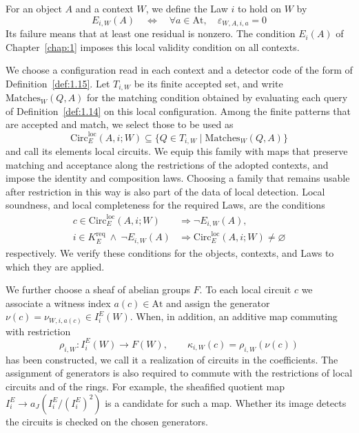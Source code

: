 \begin{definition}\label{def:2.14}

For an object $A$ and a context $W$, we define the Law $i$ to hold on $W$ by
\[
E_{i,W}(A)\quad\Longleftrightarrow\quad
\forall a\in\mathrm{At},\quad\varepsilon_{W,A,i,a}=0
\]
Its failure means that at least one residual is nonzero. The condition $E_i(A)$ of
Chapter~\ref{chap:1} imposes this local validity condition on all contexts.

We choose a configuration read in each context and a detector code of the form of
Definition~\ref{def:1.15}. Let $T_{i,W}$ be its finite accepted set, and write
$\mathrm{Matches}_W(Q,A)$ for the matching condition obtained by evaluating each query of
Definition~\ref{def:1.14} on this local configuration. Among the finite patterns that are
accepted and match, we select those to be used as
\[
\mathrm{Circ}^{\mathrm{loc}}_E(A,i;W)
\subseteq\{Q\in T_{i,W}\mid\mathrm{Matches}_W(Q,A)\}
\]
and call its elements local circuits. We equip this family with maps that preserve
matching and acceptance along the restrictions of the adopted contexts, and impose the
identity and composition laws. Choosing a family that remains usable after restriction in
this way is also part of the data of local detection. Local soundness, and local
completeness for the required Laws, are the conditions
\[
\begin{aligned}
c\in\mathrm{Circ}^{\mathrm{loc}}_E(A,i;W)
&\Longrightarrow\neg E_{i,W}(A),\\
i\in K_E^{\mathrm{req}}\ \land\ \neg E_{i,W}(A)
&\Longrightarrow\mathrm{Circ}^{\mathrm{loc}}_E(A,i;W)\ne\varnothing
\end{aligned}
\]
respectively. We verify these conditions for the objects, contexts, and Laws to which they
are applied.

We further choose a sheaf of abelian groups $F$. To each local circuit $c$ we associate a
witness index $a(c)\in\mathrm{At}$ and assign the generator
$\nu(c)=\nu_{W,i,a(c)}\in I_i^E(W)$. When, in addition, an additive map commuting with
restriction
\begin{equation*}
\rho_{i,W}:I_i^E(W)\longrightarrow F(W),
\qquad \kappa_{i,W}(c)=\rho_{i,W}(\nu(c))
\tag{2.9}\label{eq:2.9}
\end{equation*}
has been constructed, we call it a realization of circuits in the coefficients. The
assignment of generators is also required to commute with the restrictions of local
circuits and of the rings. For example, the sheafified quotient map
$I_i^E\to a_J(I_i^E/(I_i^E)^2)$ is a candidate for such a map. Whether its image detects
the circuits is checked on the chosen generators.

\end{definition}

